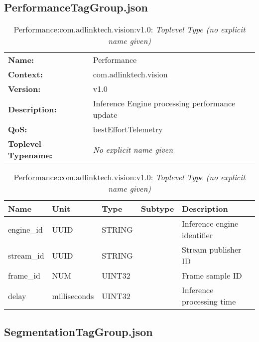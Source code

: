 \subsection{PerformanceTagGroup.json}

\begin{table}[H]
\begin{tabularx}{\textwidth}{l X} 
       \textbf{Name:} & Performance \\ 
	   \textbf{Context:} & com.adlinktech.vision \\ 
	   \textbf{Version:} & v1.0 \\ 
	   \textbf{Description:} & Inference Engine processing performance update \\ 
	   \textbf{QoS:} & bestEffortTelemetry \\
	   \textbf{Toplevel Typename:} & \textit{No explicit name given} \\ 
\end{tabularx}
\caption{Performance:com.adlinktech.vision:v1.0}\label{PerformanceTagGroup.json:table:Performance}
\bigskip
\begin{tabularx}{\textwidth}{l l l l X} 
	 \textbf{Name} & \textbf{Unit} & \textbf{Type} & \textbf{Subtype} & \textbf{Description} \\
	 \midrule
   engine\_id & UUID & STRING &  & Inference engine identifier \\
   stream\_id & UUID & STRING &  & Stream publisher ID \\
   frame\_id & NUM & UINT32 &  & Frame sample ID \\
   delay & milliseconds & UINT32 &  & Inference processing time \\
\end{tabularx}
\caption{Performance:com.adlinktech.vision:v1.0: \textit{Toplevel Type (no explicit name given)}}\label{PerformanceTagGroup.json:table:Performance-no-type-given}


\end{table}

\subsection{SegmentationTagGroup.json}

